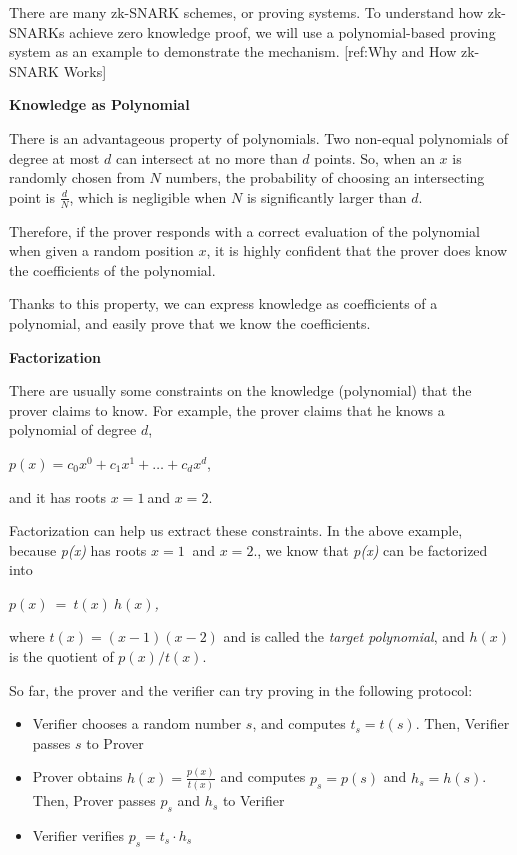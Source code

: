 \documentclass[
]{report}
\begin{document}
There are many zk-SNARK schemes, or proving systems. To understand how
zk-SNARKs achieve zero knowledge proof, we will use a polynomial-based
proving system as an example to demonstrate the mechanism.
{[}ref:Why and How zk-SNARK Works{]}

\textbf{Knowledge as Polynomial}

There is an advantageous property of polynomials. Two non-equal
polynomials of degree at most \(d\) can intersect at no more than \(d\)
points. So, when an \(x\) is randomly chosen from \(N\) numbers, the
probability of choosing an intersecting point is \(\frac{d}{N}\), which
is negligible when \(N\) is significantly larger than \(d\).

Therefore, if the prover responds with a correct evaluation of the
polynomial when given a random position \(x\), it is highly confident
that the prover does know the coefficients of the polynomial.

Thanks to this property, we can express knowledge as coefficients of a
polynomial, and easily prove that we know the coefficients.

\textbf{Factorization}

There are usually some constraints on the knowledge (polynomial) that
the prover claims to know. For example, the prover claims that he knows
a polynomial of degree \(d\),

\(p(x) = c_{0}x^{0} + c_{1}x^{1} + \ldots + c_{d}x^{d}\),

and it has roots \(x = 1\ \)and \(x = 2\).

Factorization can help us extract these constraints. In the above
example, because \emph{p(x)} has roots \(x = 1\ \) and \(x = 2\)., we
know that \emph{p(x)} can be factorized into

\(p(x)\  = \ t(x)\ h(x)\)\emph{,}

where \(t(x) = (x - 1)(x - 2)\) and is called the \emph{target
polynomial}, and \(h(x)\) is the quotient of \(p(x)\text{/}t(x)\).

So far, the prover and the verifier can try proving in the following
protocol:

\begin{itemize}
\item
  Verifier chooses a random number \(s\), and computes \(t_{s} = t(s)\).
  Then, Verifier passes \(s\) to Prover
\item
  Prover obtains \(h(x) = \frac{p(x)}{t(x)}\) and computes
  \(p_{s} = p(s)\) and \(h_{s} = h(s)\). Then, Prover passes \(p_{s}\)
  and \(h_{s}\) to Verifier
\item
  Verifier verifies \(p_{s} = t_{s} \cdot h_{s}\)
\end{itemize}
\end{document}
